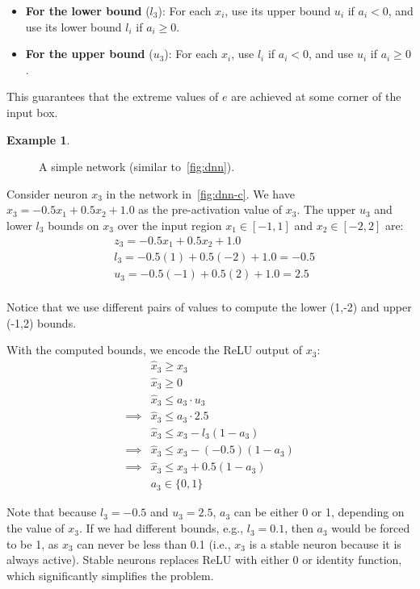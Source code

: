 \documentclass[oneside,11pt,dvipsnames]{book}
\numberwithin{equation}{section}
\theoremstyle{definition}
\newtheorem{example}{Example}[section]
\theoremstyle{remark}
\begin{document}
\begin{itemize}
    \item \textbf{For the lower bound} ($l_3$):
    For each $x_i$, use its upper bound $u_i$ if $a_i < 0$, and use its lower bound $l_i$ if $a_i \geq 0$.
    \item \textbf{For the upper bound} ($u_3$):
    For each $x_i$, use $l_i$ if $a_i < 0$, and use $u_i$ if $a_i \geq 0$.
\end{itemize}

This guarantees that the extreme values of $e$ are achieved at some corner of the input box.




\begin{example}\label{ex:relu_milp1}

\begin{figure}
\centering
{}
\caption{\label{fig:dnn-c}A simple network (similar to~\autoref{fig:dnn}).}
\end{figure}

    Consider neuron $x_3$ in the network in~\autoref{fig:dnn-c}.
    We have $x_3 = -0.5x_1 + 0.5x_2 + 1.0$ as the pre-activation value of $x_3$. The upper $u_3$ and lower $l_3$ bounds on $x_3$ over the input region $x_1 \in [-1,1]$ and $x_2\in[-2,2]$ are:
\begin{align*}
    & z_3 = -0.5x_1 + 0.5x_2 + 1.0 \\
    & l_3 = -0.5(1) + 0.5(-2) + 1.0 = -0.5 \\
    & u_3 = -0.5(-1) + 0.5(2) + 1.0 = 2.5 \\
\end{align*}

Notice that we use different pairs of values to compute the lower (1,-2) and upper (-1,2) bounds.


With the computed bounds, we encode the ReLU output of $x_3$:
\begin{align*}
    &\hat{x}_3 \geq x_3 \\
    &\hat{x}_3 \geq 0 \\
    &\hat{x}_3 \leq a_3 \cdot u_3 \\
\implies  &\hat{x}_3 \leq a_3 \cdot 2.5 \\
    &\hat{x}_3 \leq x_3 - l_3(1-a_3) \\
\implies  &\hat{x}_3 \leq x_3 - (-0.5)(1-a_3) \\
\implies  &\hat{x}_3 \leq x_3 + 0.5(1-a_3) \\
    &a_3 \in \{0,1\}
\end{align*}

Note that because $l_3 = -0.5$ and $u_3 = 2.5$, $a_3$ can be either 0 or 1, depending on the value of $x_3$. If we had different bounds, e.g., $l_3 = 0.1$, then $a_3$ would be forced to be 1, as $x_3$ can never be less than 0.1 (i.e., $x_3$ is a stable neuron because it is always active). Stable neurons replaces ReLU with either 0 or identity function, which significantly simplifies the problem.
\end{example}
\end{document}
